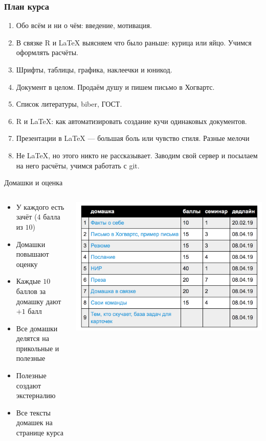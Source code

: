 \documentclass[aspectratio=169,newPxFont]{beamer}
\begin{document}
\begin{frame}
\frametitle{План курса}
\begin{enumerate}
\item  Обо всём и ни о чём: введение, мотивация.
\item  В связке R и LaTeX выясняем что было раньше: курица или яйцо.  Учимся оформлять расчёты.
\item  Шрифты, таблицы, графика, наклеечки и юникод.
\item  Документ в целом. Продаём душу и пишем письмо в Хогвартс.
\item  Список литературы, biber, ГОСТ.
\item  R и \LaTeX{:} как автоматизировать создание кучи одинаковых документов.
\item  Презентации в \LaTeX{} — большая боль или чувство стиля.  Разные мелочи
\item  \alert{Не \LaTeX{}, но этого никто не рассказывает.} Заводим свой сервер и посылаем на него расчёты, учимся работать с git. 
\end{enumerate}
\end{frame}



\begin{frame}{Домашки и оценка}
\begin{columns}
	\begin{column}{.48\linewidth}
\begin{itemize}
	\item  У каждого есть зачёт ($4$ балла из $10$)
	\item  Домашки  повышают оценку
	\item  Каждые $10$ баллов за домашку дают $+1$ балл
	\item  Все домашки делятся на прикольные и полезные 
	\item  Полезные создают экстерналию 
	\item Все тексты домашек на странице курса
\end{itemize}
	\end{column}	

	\begin{column}{.48\linewidth}
		\includegraphics[scale=0.21]{hw.png}
	\end{column}
\end{columns}
\end{frame}
\end{document}
